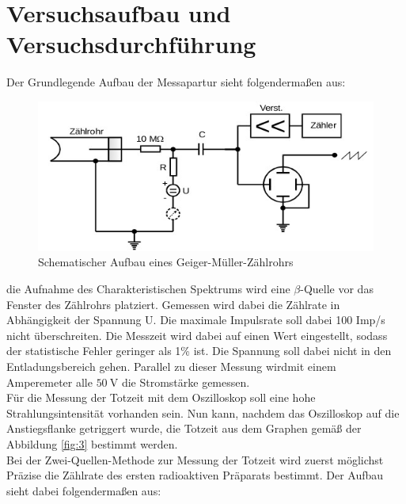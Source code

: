 
\section{Versuchsaufbau und Versuchsdurchführung}\justifying
Der Grundlegende Aufbau der Messapartur sieht folgendermaßen aus:
\begin{figure}[H]
    \centering
    \includegraphics[width=\linewidth]{images/aufbau.jpg}
    \caption{Schematischer Aufbau eines Geiger-Müller-Zählrohrs}
    \label{fig:5}
\end{figure}
\justifying die Aufnahme des Charakteristischen Spektrums wird eine $\beta$-Quelle vor das
Fenster des Zählrohrs platziert. Gemessen wird dabei die Zählrate in Abhängigkeit
der Spannung U. Die maximale Impulsrate soll dabei 100 Imp/s nicht überschreiten.
Die Messzeit wird dabei auf einen Wert eingestellt, sodass der statistische Fehler 
geringer als 1\% ist. Die Spannung soll dabei nicht in den Entladungsbereich gehen.
Parallel zu dieser Messung wirdmit einem Amperemeter alle $\SI{50}{\volt} $ die Stromstärke
gemessen.\\
Für die Messung der Totzeit mit dem Oszilloskop soll eine hohe Strahlungsintensität vorhanden sein.
Nun kann, nachdem das Oszilloskop auf die Anstiegsflanke getriggert wurde, die Totzeit
aus dem Graphen gemäß der Abbildung \ref{fig:3} bestimmt werden.\\
Bei der Zwei-Quellen-Methode zur Messung der Totzeit wird zuerst möglichst Präzise die Zählrate des
ersten radioaktiven Präparats bestimmt. Der Aufbau sieht dabei folgendermaßen aus:
